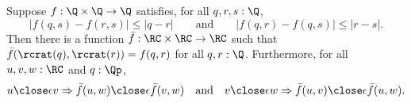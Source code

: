 %
\begin{lem} \label{RC-binary-nonexpanding-extension}
  Suppose $f : \Q \times \Q \to \Q$ satisfies, for all $q, r, s : \Q$,
  \begin{equation*}
    |f(q, s) - f(r, s)| \leq |q - r|
    \qquad\text{and}\qquad
    |f(q, r) - f(q, s)| \leq |r - s|.
  \end{equation*}
  Then there is a function $\bar{f} : \RC \times \RC \to \RC$ such that
  $\bar{f}(\rcrat(q), \rcrat(r)) = f(q,r)$ for all $q, r : \Q$. Furthermore,
  for all $u, v, w : \RC$ and $q : \Qp$,
  \begin{equation*}
    u \close\epsilon v \Rightarrow \bar{f}(u,w) \close\epsilon \bar{f}(v,w)
    \quad\text{and}\quad
    v \close\epsilon w \Rightarrow \bar{f}(u,v) \close\epsilon \bar{f}(u,w).
  \end{equation*}
\end{lem}

